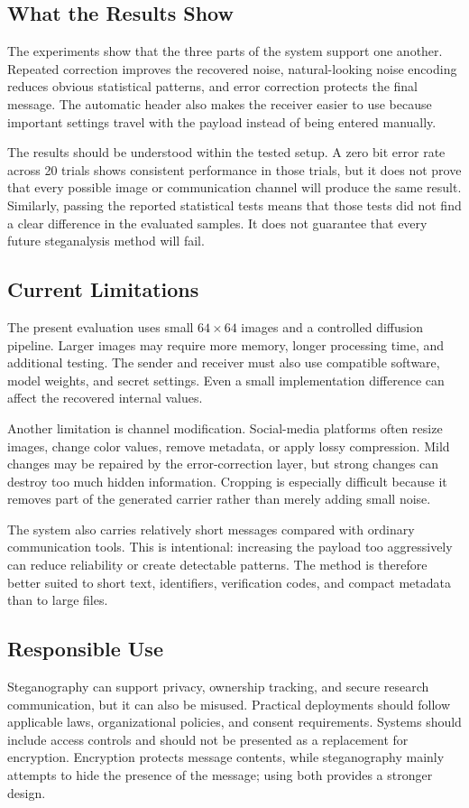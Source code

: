\documentclass[conference]{IEEEtran}
\begin{document}
\subsection{What the Results Show}
The experiments show that the three parts of the system support one another. Repeated correction improves the recovered noise, natural-looking noise encoding reduces obvious statistical patterns, and error correction protects the final message. The automatic header also makes the receiver easier to use because important settings travel with the payload instead of being entered manually.

The results should be understood within the tested setup. A zero bit error rate across 20 trials shows consistent performance in those trials, but it does not prove that every possible image or communication channel will produce the same result. Similarly, passing the reported statistical tests means that those tests did not find a clear difference in the evaluated samples. It does not guarantee that every future steganalysis method will fail.

\subsection{Current Limitations}
The present evaluation uses small $64 \times 64$ images and a controlled diffusion pipeline. Larger images may require more memory, longer processing time, and additional testing. The sender and receiver must also use compatible software, model weights, and secret settings. Even a small implementation difference can affect the recovered internal values.

Another limitation is channel modification. Social-media platforms often resize images, change color values, remove metadata, or apply lossy compression. Mild changes may be repaired by the error-correction layer, but strong changes can destroy too much hidden information. Cropping is especially difficult because it removes part of the generated carrier rather than merely adding small noise.

The system also carries relatively short messages compared with ordinary communication tools. This is intentional: increasing the payload too aggressively can reduce reliability or create detectable patterns. The method is therefore better suited to short text, identifiers, verification codes, and compact metadata than to large files.

\subsection{Responsible Use}
Steganography can support privacy, ownership tracking, and secure research communication, but it can also be misused. Practical deployments should follow applicable laws, organizational policies, and consent requirements. Systems should include access controls and should not be presented as a replacement for encryption. Encryption protects message contents, while steganography mainly attempts to hide the presence of the message; using both provides a stronger design.
\end{document}
